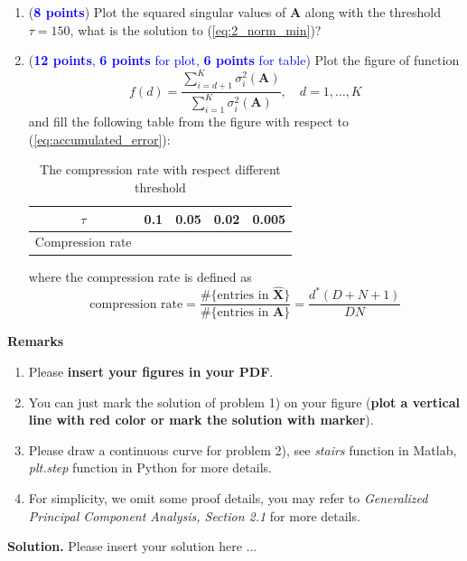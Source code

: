 \documentclass[english,onecolumn]{IEEEtran}
\begin{document}
\begin{enumerate}
    \item (\textcolor{blue}{\textbf{8 points}}) Plot the squared singular values of $\mathbf{A}$  along with the threshold $\tau=150$, what is the solution to (\ref{eq:2_norm_min})?
    \item (\textcolor{blue}{\textbf{12 points}, \textbf{6 points} for plot, \textbf{6 points} for table}) Plot the figure of function 
    \begin{equation}
        f(d)=\frac{\sum_{i=d+1}^K\sigma_{i}^2(\mathbf{A})}{\sum_{i=1}^K\sigma_i^2(\mathbf{A})},\quad d=1,\dots,K
    \end{equation}
    and fill the following table from the figure with respect to (\ref{eq:accumulated_error}):
    \begin{table}[htb]
    \centering
    \begin{tabular}{|l|l|l|l|l|}
    \hline
    \multicolumn{1}{|c|}{$\tau$} & 0.1 & 0.05 & 0.02 & 0.005 \\ \hline
    Compression rate             &   &    &   &  \\ \hline
    \end{tabular}
    \caption{The compression rate with respect different threshold}
    \end{table}
    
    where the compression rate is defined as 
    \begin{equation}
        \text{compression rate}=\frac{\#\{\text{entries in } \hat{\mathbf{X}}\}}{\#\{\text{entries in } \mathbf{A}\}}=\frac{d^*(D+N+1)}{DN}
    \end{equation}
\end{enumerate}



{\bf Remarks}
\begin{enumerate}
    \item Please \textbf{insert your figures in your PDF}.
    \item You can just mark the solution of problem 1) on your figure (\textbf{plot a vertical line with red color or mark the solution with marker}).
    \item Please draw a continuous curve for problem 2), see \textit{stairs} function in Matlab, \textit{plt.step} function in Python for more details.
    \item For simplicity, we omit some proof details, you may refer to \textit{Generalized Principal Component Analysis, Section 2.1} for more details.
\end{enumerate}

\noindent
\textbf{Solution.}
Please insert your solution here ...
\end{document}
